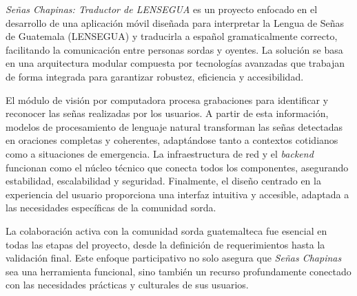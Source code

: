 \textit{Señas Chapinas: Traductor de LENSEGUA} es un proyecto enfocado en el desarrollo de una aplicación móvil diseñada para interpretar la Lengua de Señas de Guatemala (LENSEGUA) y traducirla a español gramaticalmente correcto, facilitando la comunicación entre personas sordas y oyentes. La solución se basa en una arquitectura modular compuesta por tecnologías avanzadas que trabajan de forma integrada para garantizar robustez, eficiencia y accesibilidad.

 El módulo de visión por computadora procesa grabaciones para identificar y reconocer las señas realizadas por los usuarios. A partir de esta información, modelos de procesamiento de lenguaje natural transforman las señas detectadas en oraciones completas y coherentes, adaptándose tanto a contextos cotidianos como a situaciones de emergencia. La infraestructura de red y el \textit{backend} funcionan como el núcleo técnico que conecta todos los componentes, asegurando estabilidad, escalabilidad y seguridad. Finalmente, el diseño centrado en la experiencia del usuario proporciona una interfaz intuitiva y accesible, adaptada a las necesidades específicas de la comunidad sorda.

La colaboración activa con la comunidad sorda guatemalteca fue esencial en todas las etapas del proyecto, desde la definición de requerimientos hasta la validación final. Este enfoque participativo no solo asegura que \textit{Señas Chapinas} sea una herramienta funcional, sino también un recurso profundamente conectado con las necesidades prácticas y culturales de sus usuarios.